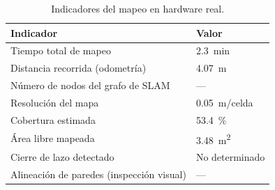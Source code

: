 \begin{table}[H]
\centering
\caption{Indicadores del mapeo en hardware real.}
\label{tab:slam_real_indicadores}
\begin{tabular}{ll}
\hline
\textbf{Indicador} & \textbf{Valor} \\
\hline
Tiempo total de mapeo                  & 2.3~min \\
Distancia recorrida (odometría)        & 4.07~m \\
Número de nodos del grafo de SLAM      & --- \\
Resolución del mapa                    & 0.05~m/celda \\
Cobertura estimada                     & 53.4~\% \\
Área libre mapeada                     & 3.48~m\textsuperscript{2} \\
Cierre de lazo detectado               & No determinado \\
Alineaci\'on de paredes (inspecci\'on visual) & --- \\
\hline
\end{tabular}
\end{table}
